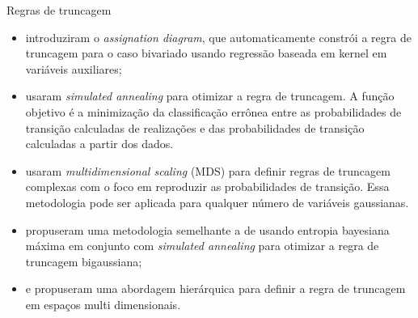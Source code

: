 \documentclass[aspectratio=169]{beamer}
\begin{document}
\begin{frame}[allowframebreaks]{Regras de truncagem}
	\begin{itemize}
		\item \cite{allard2012non} introduziram o \textit{assignation diagram}, que automaticamente constrói a regra de truncagem para o caso bivariado usando regressão baseada em kernel em variáveis auxiliares;
		\item \cite{sadeghi_optimizing} usaram \textit{simulated annealing} para otimizar a regra de truncagem. A função objetivo é a minimização da classificação errônea entre as probabilidades de transição calculadas de realizações e das probabilidades de transição calculadas a partir dos dados.
		\item \cite{deutsch2014multidimensional} usaram \textit{multidimensional scaling} (MDS) para definir regras de truncagem complexas com o foco em reproduzir as probabilidades de transição. Essa metodologia pode ser aplicada para qualquer número de variáveis gaussianas.		 
		\item \cite{astrakova2015truncation} propuseram uma metodologia semelhante a de \cite{deutsch2014multidimensional} usando entropia bayesiana máxima em conjunto com \textit{simulated annealing} para otimizar a regra de truncagem bigaussiana;
		\item \cite{madani2015simulation} e \cite{hier_plurigauss} propuseram uma abordagem hierárquica para definir a regra de truncagem em espaços multi dimensionais.
\end{itemize}
\end{frame}
\end{document}
